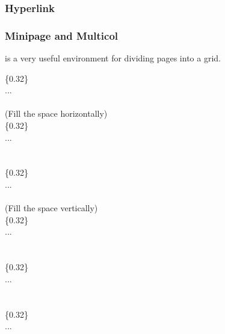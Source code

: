 \begin{frame}
	\frametitle{Hyperlink}
	
\end{frame}

\begin{frame}
	\frametitle{Minipage and Multicol}
	 is a very useful environment for dividing pages into a grid.
	\begin{example}
		\begin{multicols}{2}
			\{0.32\}\\
			\qquad ...\\
			\\
			 (Fill the space horizontally)\\
			\{0.32\}\\
			\qquad ...\\
			\\
			\\
			\{0.32\}\\
			\qquad ...\\
			\\
			 (Fill the space vertically)\\
			\{0.32\}\\
			\qquad ...\\
			\\
			\\
			\{0.32\}\\
			\qquad ...\\
			\\
			\\
			\{0.32\}\\
			\qquad ...\\
			\\
		\end{multicols}	
	\end{example}
\end{frame}

